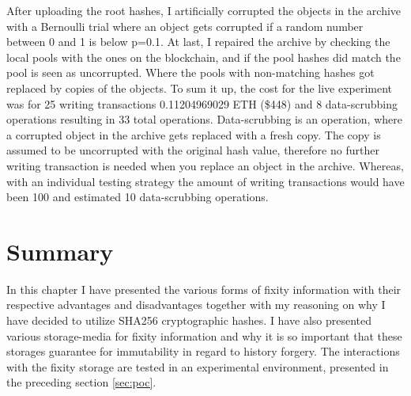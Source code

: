 After uploading the root hashes, I artificially corrupted the objects in the archive with a Bernoulli trial where an object gets corrupted if a random number between 0 and 1 is below p=0.1. At last, I repaired the archive by checking the local pools with the ones on the blockchain, and if the pool hashes did match the pool is seen as uncorrupted. Where the pools with non-matching hashes got replaced by copies of the objects.
To sum it up, the cost for the live experiment was for 25 writing transactions 0.11204969029 ETH (\$448) and 8 data-scrubbing operations resulting in 33 total operations. Data-scrubbing is an operation, where a corrupted object in the archive gets replaced with a fresh copy. The copy is assumed to be uncorrupted with the original hash value, therefore no further writing transaction is needed when you replace an object in the archive. Whereas, with an individual testing strategy the amount of writing transactions would have been 100 and estimated 10 data-scrubbing operations.

\section{Summary}
In this chapter I have presented the various forms of fixity information with their respective advantages and disadvantages together with my reasoning on why I have decided to utilize SHA256 cryptographic hashes. I have also presented various storage-media for fixity information and why it is so important that these storages guarantee for immutability in regard to history forgery. The interactions with the fixity storage are tested in an experimental environment, presented in the preceding section \ref{sec:poc}.